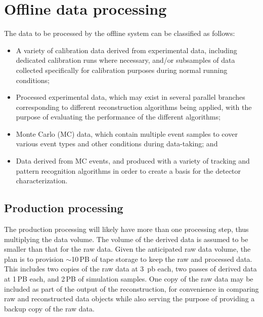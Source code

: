 \section{Offline data processing} %
\label{sec:protodune-offline}

The data to be processed by the offline system can be classified as follows:
\begin{itemize}

\item A variety of calibration data derived from experimental data, including dedicated calibration
runs where necessary, and/or subsamples of data collected specifically for calibration
purposes during normal running conditions;

\item Processed experimental data, which may exist in several parallel branches corresponding to
different reconstruction algorithms being applied, with the purpose of evaluating the performance
of the different algorithms;

\item Monte Carlo (MC) data, which contain multiple event samples to cover various event types
and other conditions during data-taking; and %

\item Data derived from MC events, and produced with a variety of tracking and pattern recognition algorithms
in order to create a basis for the detector characterization.

\end{itemize}

\subsection{Production processing}
\label{sec:prod-process}

The production processing will likely have  more than one processing step,
thus  multiplying the data volume.  The volume of the derived data is assumed to be smaller than that for the raw data.
Given the anticipated raw data volume, %
the %
plan is to provision $\sim$10\,PB of tape storage to keep the raw and processed data. This includes
two copies of the raw data at 3~pb each, two passes of derived data at 1\,PB each, and 2\,PB of simulation samples.
One copy of the raw data may be included as part of the output of the reconstruction, for convenience in comparing
raw and reconstructed data objects while also serving the purpose of providing a backup copy of the raw data.


